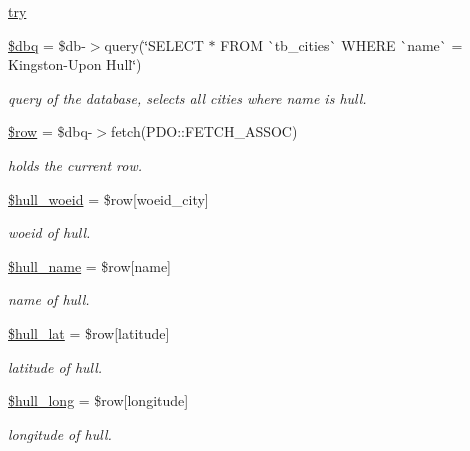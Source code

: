 \begin{DoxyCompactItemize}
\mbox{\hyperlink{index_8php_a3d12b343d049cdea93240f06b0e8467c}{try}}
\item 
\mbox{\hyperlink{index_8php_ab76933014035168a37e7e525ca8fbabe}{\$dbq}} = \$db-\/$>$query(\char`\"{}S\+E\+L\+E\+CT $\ast$ F\+R\+OM \`{}tb\+\_\+cities\`{} W\+H\+E\+RE \`{}name\`{} = \textquotesingle{}Kingston-\/Upon Hull\textquotesingle{}\char`\"{})
\begin{DoxyCompactList}\small\item\em query of the database, selects all cities where name is hull. \end{DoxyCompactList}\item 
\mbox{\hyperlink{index_8php_aa1d731aa570613e5bcff831bb10e9b87}{\$row}} = \$dbq-\/$>$fetch(P\+D\+O\+::\+F\+E\+T\+C\+H\+\_\+\+A\+S\+S\+OC)
\begin{DoxyCompactList}\small\item\em holds the current row. \end{DoxyCompactList}\item 
\mbox{\hyperlink{index_8php_a0255f88ae7eba38efbea0defdb8268a2}{\$hull\+\_\+woeid}} = \$row\mbox{[}\textquotesingle{}woeid\+\_\+city\textquotesingle{}\mbox{]}
\begin{DoxyCompactList}\small\item\em woeid of hull. \end{DoxyCompactList}\item 
\mbox{\hyperlink{index_8php_a5152ab3c5de633a3e7e5620ac57cf288}{\$hull\+\_\+name}} = \$row\mbox{[}\textquotesingle{}name\textquotesingle{}\mbox{]}
\begin{DoxyCompactList}\small\item\em name of hull. \end{DoxyCompactList}\item 
\mbox{\hyperlink{index_8php_a579767912e585d5819aa7bfe22e174f8}{\$hull\+\_\+lat}} = \$row\mbox{[}\textquotesingle{}latitude\textquotesingle{}\mbox{]}
\begin{DoxyCompactList}\small\item\em latitude of hull. \end{DoxyCompactList}\item 
\mbox{\hyperlink{index_8php_af542f209855ac8d02cd14c494f6ea9c9}{\$hull\+\_\+long}} = \$row\mbox{[}\textquotesingle{}longitude\textquotesingle{}\mbox{]}
\begin{DoxyCompactList}\small\item\em longitude of hull. \end{DoxyCompactList}\item 

\end{DoxyCompactItemize}
